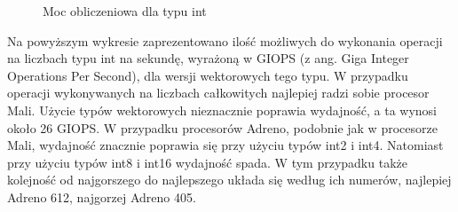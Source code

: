 \begin{figure}[H]
\caption{Moc obliczeniowa dla typu int}
\end{figure}
Na powyższym wykresie zaprezentowano ilość możliwych do wykonania operacji na liczbach typu int na sekundę, wyrażoną w GIOPS (z ang. Giga Integer Operations Per Second), dla wersji wektorowych tego typu. W przypadku operacji wykonywanych na liczbach całkowitych najlepiej radzi sobie procesor Mali. Użycie typów wektorowych nieznacznie poprawia wydajność, a ta wynosi około 26 GIOPS. W przypadku procesorów Adreno, podobnie jak w procesorze Mali, wydajność znacznie poprawia się przy użyciu typów int2 i int4. Natomiast przy użyciu typów int8 i int16 wydajność spada. W tym przypadku także kolejność od najgorszego do najlepszego układa się według ich numerów, najlepiej Adreno 612, najgorzej Adreno 405.


